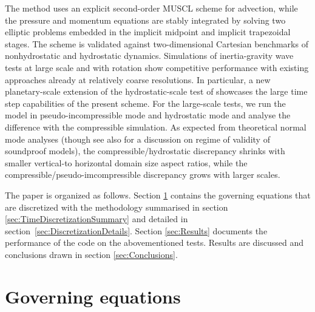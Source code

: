 \documentclass{ametsoc}
\theoremstyle{definition}
\begin{document}
The method uses an explicit second-order MUSCL scheme for advection, while the pressure and momentum equations are stably integrated by solving two elliptic problems embedded in the implicit midpoint and implicit trapezoidal stages. The scheme is validated against two-dimensional Cartesian benchmarks of nonhydrostatic and hydrostatic dynamics. Simulations of inertia-gravity wave tests at large scale and with rotation show competitive performance with existing approaches already at relatively coarse resolutions. In particular, a new planetary-scale extension of the hydrostatic-scale test of \cite{SkamarockKlemp1994} showcases the large time step capabilities of the present scheme. For the large-scale tests, we run the model in pseudo-incompressible mode and hydrostatic mode and analyse the difference with the compressible simulation. As expected from theoretical normal mode analyses \citep{DaviesEtAl2003, Dukowicz2013} (though see also \cite{KleinEtAl2010} for a discussion on regime of validity of soundproof models), the compressible/hydrostatic discrepancy shrinks with smaller vertical-to horizontal domain size aspect ratios, while the compressible/pseudo-imcompressible discrepancy grows with larger scales.

The paper is organized as follows. Section \ref{sec:GoverningEquations} contains the governing equations that are discretized with the methodology summarised in section \ref{sec:TimeDiscretizationSummary} and detailed in section~\ref{sec:DiscretizationDetails}. Section \ref{sec:Results} documents the performance of the code on the abovementioned tests. Results are discussed and conclusions drawn in section \ref{sec:Conclusions}. 


\section{Governing equations}
\label{sec:GoverningEquations}
\end{document}
